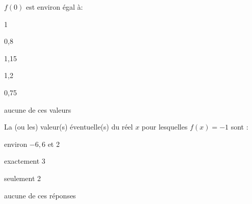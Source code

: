 \begin{QCM}
\begin{GroupeQCM}
\begin{exercice} $f(0)$ est environ égal à:
 \begin{ChoixQCM}{3}
 \item 1
 \item 0,8
 \item 1,15
 \item 1,2
 \item 0,75
 \item aucune de ces valeurs
    \end{ChoixQCM}
     \begin{corrige}
    \end{corrige}
\end{exercice}
\begin{exercice}La (ou les) valeur(s) éventuelle(s) du réel $x$ pour lesquelles  $f(x)=-1$ sont : 
 \begin{ChoixQCM}{2}
 \item       environ $-6,6$ et 2
 \item exactement 3
 \item seulement 2
 \item aucune de ces réponses
    \end{ChoixQCM}
     \begin{corrige}
    \end{corrige}
\end{exercice}
\end{GroupeQCM}
\end{QCM}




  